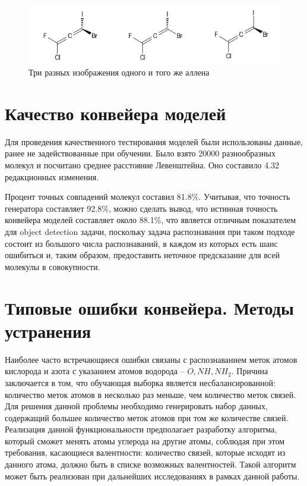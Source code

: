 \begin{figure}[h!] 
	\center
	\includegraphics [scale=1.0] {my_folder/images/allene}
	\caption{Три разных изображения одного и того же аллена}
	\label{fig:allenes}
\end{figure}
	
\section{Качество конвейера моделей} \label{ch3:sec2}
Для проведения качественного тестирования моделей были использованы данные, ранее не задействованные при обучении. Было взято 20000 разнообразных молекул и посчитано среднее расстояние Левенштейна. Оно составило 4.32 редакционных изменения.

Процент точных совпадений молекул составил 81.8\%. Учитывая, что точность генератора составляет 92.8\%, можно сделать вывод, что истинная точность конвейера моделей составляет около 88.1\%, что является отличным показателем для object detection задачи, поскольку задача распознавания при таком подходе состоит из большого числа распознаваний, в каждом из которых есть шанс ошибиться и, таким образом, предоставить неточное предсказание для всей молекулы в совокупности.

\section{Типовые ошибки конвейера. Методы устранения} \label{ch3:sec3}

Наиболее часто встречающиеся ошибки связаны с распознаванием меток атомов кислорода и азота с указанием атомов водорода -- $O, NH, NH_2$. Причина заключается в том, что обучающая выборка является несбалансированной: количество меток атомов в несколько раз меньше, чем количество меток связей. Для решения данной проблемы необходимо генерировать набор данных, содержащий большее количество меток атомов при том же количестве связей. Реализация данной функциональности предполагает разработку алгоритма, который сможет менять атомы углерода на другие атомы, соблюдая при этом требования, касающиеся валентности: количество связей, которые исходят из данного атома, должно быть в списке возможных валентностей. Такой алгоритм может быть реализован при дальнейших исследованиях в рамках данной работы.

